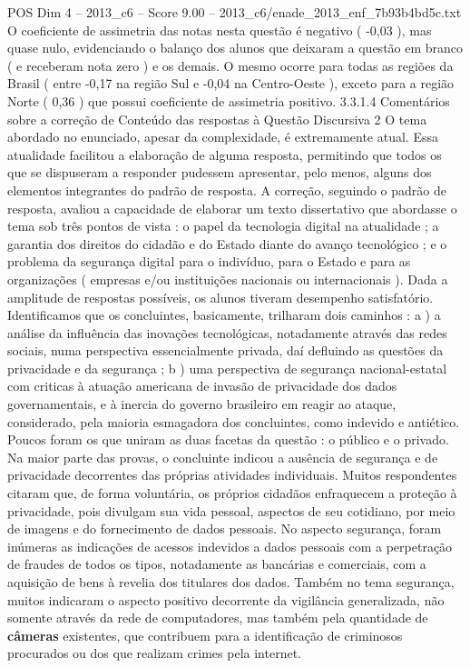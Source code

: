 \begin{textsample}{POS Dim 4 – 2013\_c6 – Score 9.00 – 2013\_c6/enade\_2013\_enf\_7b93b4bd5c.txt}
O coeficiente de assimetria das notas nesta questão é negativo ( -0,03 ), mas quase nulo, evidenciando o balanço dos alunos que deixaram a questão em branco ( e receberam nota zero ) e os demais.
O mesmo ocorre para todas as regiões da Brasil ( entre -0,17 na região Sul e -0,04 na Centro-Oeste ), exceto para a região Norte ( 0,36 ) que possui coeficiente de assimetria positivo. 3.3.1.4 Comentários sobre a correção de Conteúdo das respostas à Questão Discursiva 2 O tema abordado no enunciado, apesar da complexidade, é extremamente atual.
Essa atualidade facilitou a elaboração de alguma resposta, permitindo que todos os que se dispuseram a responder pudessem apresentar, pelo menos, alguns dos elementos integrantes do padrão de resposta.
A correção, seguindo o padrão de resposta, avaliou a capacidade de elaborar um texto dissertativo que abordasse o tema sob três pontos de vista : o papel da tecnologia digital na atualidade ; a garantia dos direitos do cidadão e do Estado diante do avanço tecnológico ; e o problema da segurança digital para o indivíduo, para o Estado e para as organizações ( empresas e/ou instituições nacionais ou internacionais ).
Dada a amplitude de respostas possíveis, os alunos tiveram desempenho satisfatório.
Identificamos que os concluintes, basicamente, trilharam dois caminhos : a ) a análise da influência das inovações tecnológicas, notadamente através das redes sociais, numa perspectiva essencialmente privada, daí defluindo as questões da privacidade e da segurança ; b ) uma perspectiva de segurança nacional-estatal com criticas à atuação americana de invasão de privacidade dos dados governamentais, e à inercia do governo brasileiro em reagir ao ataque, considerado, pela maioria esmagadora dos concluintes, como indevido e antiético.
Poucos foram os que uniram as duas facetas da questão : o público e o privado.
Na maior parte das provas, o concluinte indicou a ausência de segurança e de privacidade decorrentes das próprias atividades individuais.
Muitos respondentes citaram que, de forma voluntária, os próprios cidadãos enfraquecem a proteção à privacidade, pois divulgam sua vida pessoal, aspectos de seu cotidiano, por meio de imagens e do fornecimento de dados pessoais.
No aspecto segurança, foram inúmeras as indicações de acessos indevidos a dados pessoais com a perpetração de fraudes de todos os tipos, notadamente as bancárias e comerciais, com a aquisição de bens à revelia dos titulares dos dados.
Também no tema segurança, muitos indicaram o aspecto positivo decorrente da vigilância generalizada, não somente através da rede de computadores, mas também pela quantidade de \textbf{câmeras} existentes, que contribuem para a identificação de criminosos procurados ou dos que realizam crimes pela internet.

\end{textsample}
